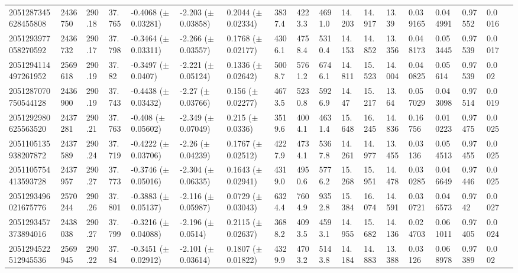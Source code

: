\begin{sidewaystable}[htbp]
{\begin{tabular}{llllllllllllllllll}
            2051287345628455808 & 2436750 & 290.18 & 37.765 & -0.4068 ($\pm$ 0.03281) & -2.203 ($\pm$ 0.03858) & 0.2044 ($\pm$ 0.02334) & 3837.4 & 4223.3 & 4691.0 & 14.203 & 14.917 & 13.39 & 0.039165 & 0.044991 & 0.97552 & 0.0016 & \\
            2051293977058270592 & 2436732 & 290.17 & 37.798 & -0.3464 ($\pm$ 0.03311) & -2.266 ($\pm$ 0.03557) & 0.1768 ($\pm$ 0.02177) & 4306.1 & 4758.4 & 5310.4 & 14.153 & 14.852 & 13.356 & 0.048173 & 0.053445 & 0.97539 & 0.0017 & \\
            2051294114497261952 & 2569618 & 290.19 & 37.82 & -0.3497 ($\pm$ 0.0407) & -2.221 ($\pm$ 0.05124) & 0.1336 ($\pm$ 0.02642) & 5008.7 & 5761.2 & 6746.1 & 14.811 & 15.523 & 14.004 & 0.040825 & 0.05614 & 0.97539 & 0.002 & \\
            2051287070750544128 & 2436900 & 290.19 & 37.743 & -0.4438 ($\pm$ 0.03432) & -2.27 ($\pm$ 0.03766) & 0.156 ($\pm$ 0.02277) & 4673.5 & 5230.8 & 5926.9 & 14.47 & 15.217 & 13.64 & 0.057029 & 0.043098 & 0.97514 & 0.0019 & \\
            2051292980625563520 & 2437281 & 290.21 & 37.763 & -0.408 ($\pm$ 0.05602) & -2.349 ($\pm$ 0.07049) & 0.215 ($\pm$ 0.0336) & 3519.6 & 4004.1 & 4631.4 & 15.648 & 16.245 & 14.836 & 0.16756 & 0.010223 & 0.97475 & 0.0025 & \\
            2051105135938207872 & 2437589 & 290.24 & 37.719 & -0.4222 ($\pm$ 0.03706) & -2.26 ($\pm$ 0.04239) & 0.1767 ($\pm$ 0.02512) & 4227.9 & 4734.1 & 5367.8 & 14.261 & 14.977 & 13.455 & 0.03136 & 0.054513 & 0.97455 & 0.0025 & \\
            2051105754413593728 & 2437957 & 290.27 & 37.773 & -0.3746 ($\pm$ 0.05016) & -2.304 ($\pm$ 0.06335) & 0.1643 ($\pm$ 0.02941) & 4319.0 & 4950.6 & 5776.2 & 15.268 & 15.951 & 14.478 & 0.030285 & 0.046649 & 0.97446 & 0.0025 & \\
            2051293496021675776 & 2570244 & 290.26 & 37.801 & -0.3883 ($\pm$ 0.05137) & -2.116 ($\pm$ 0.05987) & 0.0729 ($\pm$ 0.03043) & 6324.4 & 7604.9 & 9352.8 & 15.384 & 16.074 & 14.591 & 0.030721 & 0.046573 & 0.9742 & 0.0027 & \\
            2051293457373894016 & 2438038 & 290.27 & 37.799 & -0.3216 ($\pm$ 0.04088) & -2.196 ($\pm$ 0.0514) & 0.2115 ($\pm$ 0.02637) & 3688.2 & 4093.5 & 4593.1 & 14.955 & 15.682 & 14.136 & 0.024703 & 0.061011 & 0.97405 & 0.0024 & \\
            2051294522512945536 & 2569945 & 290.22 & 37.84 & -0.3451 ($\pm$ 0.02912) & -2.101 ($\pm$ 0.03614) & 0.1807 ($\pm$ 0.01822) & 4329.9 & 4703.2 & 5143.8 & 14.184 & 14.883 & 13.388 & 0.03126 & 0.068978 & 0.97389 & 0.002 & \\

\end{tabular}}
\end{sidewaystable}
